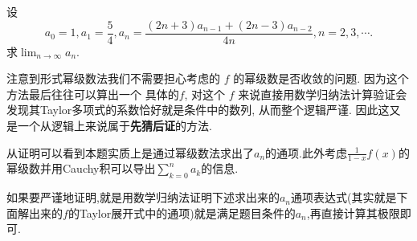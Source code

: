 \documentclass[../../main.tex]{subfiles}
\begin{document}
\begin{example}
设
\[
a_0=1,a_1=\frac{5}{4},a_n=\frac{(2n+3)a_{n-1}+(2n-3)a_{n-2}}{4n},n=2,3,\cdots.
\]
求$\lim_{n\rightarrow \infty}a_n$.
\end{example}
\begin{note}
注意到形式幂级数法我们不需要担心考虑的 \( f \) 的幂级数是否收敛的问题. 因为这个方法最后往往可以算出一个 具体的\( f \), 对这个 \( f \) 来说直接用数学归纳法计算验证会发现其Taylor多项式的系数恰好就是条件中的数列, 从而整个逻辑严谨. 因此这又是一个从逻辑上来说属于\textbf{先猜后证}的方法.

从证明可以看到本题实质上是通过幂级数法求出了$a_n$的通项.此外考虑$\frac{1}{1-x}f(x)$的幂级数并用Cauchy积可以导出$\sum_{k=0}^n a_k$的信息.

如果要严谨地证明,就是用数学归纳法证明下述求出来的$a_n$通项表达式(其实就是下面解出来的$f$的Taylor展开式中的通项)就是满足题目条件的$a_n$,再直接计算其极限即可.
\end{note}
\end{document}
